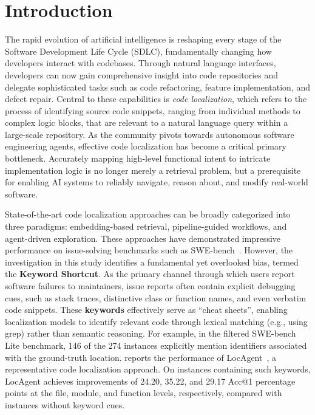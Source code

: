 \section{Introduction}\label{sec:intro-dataloc}
The rapid evolution of artificial intelligence is reshaping every stage of the Software Development Life Cycle (SDLC), fundamentally changing how developers interact with codebases. Through natural language interfaces, developers can now gain comprehensive insight into code repositories and delegate sophisticated tasks such as code refactoring, feature implementation, and defect repair. Central to these capabilities is \textit{code localization}, which refers to the process of identifying source code snippets, ranging from individual methods to complex logic blocks, that are relevant to a natural language query within a large-scale repository. As the community pivots towards autonomous software engineering agents, effective code localization has become a critical primary bottleneck. Accurately mapping high-level functional intent to intricate implementation logic is no longer merely a retrieval problem, but a prerequisite for enabling AI systems to reliably navigate, reason about, and modify real-world software.

State-of-the-art code localization approaches can be broadly categorized into three paradigms:
embedding-based retrieval, pipeline-guided workflows, and agent-driven exploration. These
approaches have demonstrated impressive performance on issue-solving benchmarks such as
SWE-bench~\cite{swebench2024}. However, the investigation in this study identifies a fundamental yet overlooked
bias, termed the \textbf{Keyword Shortcut}.
As the primary channel through which users report software failures to maintainers, issue reports
often contain explicit debugging cues, such as stack traces, distinctive class or function names,
and even verbatim code snippets.
These \textbf{keywords} effectively serve as ``cheat sheets'', enabling localization models to
identify relevant code through lexical matching (e.g., using grep) rather than semantic reasoning.
For example, in the filtered SWE-bench Lite benchmark, 146 of the 274 instances explicitly mention
identifiers associated with the ground-truth location.
 reports the performance of LocAgent~\cite{chen-etal-2025-locagent},
a representative code localization approach.
On instances containing such keywords, LocAgent achieves improvements of 24.20, 35.22, and 29.17
Acc@1 percentage points at the file, module, and function levels, respectively, compared with
instances without keyword cues.

